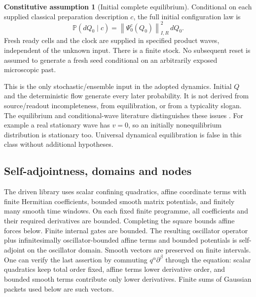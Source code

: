 \documentclass[11pt]{article}
\theoremstyle{definition}\newtheorem{assumption}[theorem]{Constitutive assumption}
\theoremstyle{remark}\newtheorem{remark}[theorem]{Remark}
\newcommand{\Prb}{\mathbb P}\newcommand{\TV}{d_{\rm TV}}
\newcommand{\norm}[1]{\left\|#1\right\|}\newcommand{\pos}[1]{[#1]_+}
\begin{document}
\begin{assumption}[Initial complete equilibrium]\label{ax:eq}
Conditional on each supplied classical preparation description $c$, the full initial configuration law is
\begin{equation}\label{eq:equilibrium}
 \Prb(dQ_0\mid c)=\norm{\Psi_0^c(Q_0)}_{I,R}^2\,dQ_0.
\end{equation}
Fresh ready cells and the clock are supplied in specified product waves, independent of the unknown input. There is a finite stock. No subsequent reset is assumed to generate a fresh seed conditional on an arbitrarily exposed microscopic past.
\end{assumption}
This is the only stochastic/ensemble input in the adopted dynamics. Initial $Q$ and the deterministic flow generate every later probability. It is not derived from source/readout incompleteness, from equilibration, or from a typicality slogan. The equilibrium and conditional-wave literature distinguishes these issues \cite{DGZeq}. For example a real stationary wave has $v=0$, so an initially nonequilibrium distribution is stationary too. Universal dynamical equilibration is false in this class without additional hypotheses.

\subsection{Self-adjointness, domains and nodes}
The driven library uses scalar confining quadratics, affine coordinate terms with finite Hermitian coefficients, bounded smooth matrix potentials, and finitely many smooth time windows. On each fixed finite programme, all coefficients and their required derivatives are bounded. Completing the square bounds affine forces below. Finite internal gates are bounded. The resulting oscillator operator plus infinitesimally oscillator-bounded affine terms and bounded potentials is self-adjoint on the oscillator domain. Smooth vectors are preserved on finite intervals. One can verify the last assertion by commuting $q^\alpha\partial^\beta$ through the equation: scalar quadratics keep total order fixed, affine terms lower derivative order, and bounded smooth terms contribute only lower derivatives. Finite sums of Gaussian packets used below are such vectors.
\end{document}
